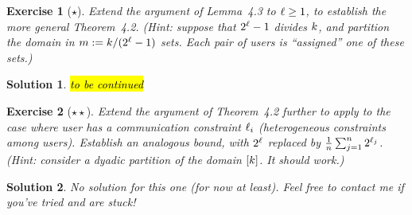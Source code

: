 \documentclass[biber]{nowfnt} %
\newtheorem{question}{Exercise}[chapter]
\newtheorem{solution}{Solution}[chapter]
\newcommand{\tbc}{\noindent\hl{\sc{}to be continued}\xspace}
\newcommand{\tbc}{}
\begin{document}
\begin{question}[$\star$]\label{exo:simulate:infer}
Extend the argument of Lemma~4.3 to $\ell\geq 1$, to establish the more general Theorem~4.2. \emph{(Hint: suppose that $2^\ell -1$ divides $k$, and partition the domain in $m:= k/(2^\ell -1)$ sets. Each pair of users is ``assigned'' one of these sets.)}
\end{question}
\begin{solution}
\tbc
\end{solution}

\begin{question}[$\star\star$]\label{exo:heterogeneous}
Extend the argument of Theorem~4.2 further to apply to the case where user has a communication constraint $\ell_i$ (heterogeneous constraints among users). Establish an analogous bound, with $2^\ell$ replaced by $\frac{1}{n}\sum_{j=1}^n 2^{\ell_j}$. \emph{(Hint: consider a dyadic partition of the domain $[k]$. It \emph{should} work.)}
\end{question}
\begin{solution}\itshape
No solution for this one (for now at least). Feel free to contact me if you've tried and are stuck!
\end{solution}
  
  
\printbibliography
\end{document}
